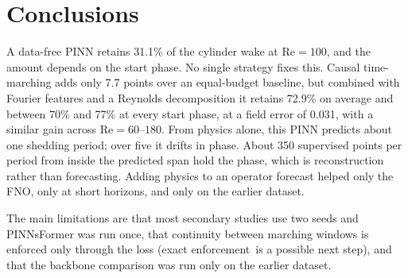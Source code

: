 \documentclass[11pt,a4paper]{article}
\newcommand{\Rey}{\mathrm{Re}}
\begin{document}
\FloatBarrier
\section{Conclusions}

A data-free PINN retains 31.1\% of the cylinder wake at $\Rey = 100$, and the
amount depends on the start phase. No single strategy fixes this. Causal
time-marching adds only 7.7 points over an equal-budget baseline, but combined
with Fourier features and a Reynolds decomposition it retains 72.9\% on
average and between 70\% and 77\% at every start phase, at a field error of
0.031, with a similar gain across $\Rey = 60$--$180$. From physics alone, this
PINN predicts about one shedding period; over five it drifts in phase. About
350 supervised points per period from inside the predicted span hold the
phase, which is reconstruction rather than forecasting. Adding physics to an
operator forecast helped only the FNO, only at short horizons, and only on the
earlier dataset.

The main limitations are that most secondary studies use two seeds and
PINNsFormer was run once, that continuity between marching windows is enforced
only through the loss (exact enforcement\,\cite{roy2024} is a possible next
step), and that the backbone comparison was run only on the earlier dataset.
\end{document}
